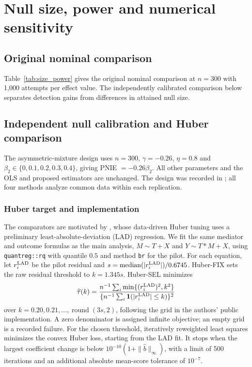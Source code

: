 \clearpage
\section{Null size, power and numerical sensitivity}
\label{sec:calibrated-power}

\subsection{Original nominal comparison}

Table~\ref{tab:size_power} gives the original nominal comparison at $n=300$ with 1,000 attempts per effect value. The independently calibrated comparison below separates detection gains from differences in attained null size.


\FloatBarrier

\subsection{Independent null calibration and Huber comparison}

The asymmetric-mixture design uses $n=300$, $\gamma=-0.26$, $\eta=0.8$ and $\beta_2\in\{0,0.1,0.2,0.3,0.4\}$, giving PNIE $=-0.26\beta_2$. All other parameters and the OLS and proposed estimators are unchanged. The design was recorded in ; all four methods analyze common data within each replication.

\subsubsection*{Huber target and implementation}

The comparators are motivated by \citet{wang2025}, whose data-driven Huber tuning uses a preliminary least-absolute-deviation (LAD) regression. We fit the same mediator and outcome formulas as the main analysis, $M\sim T+X$ and $Y\sim T*M+X$, using \texttt{quantreg::rq} with quantile $0.5$ and method \texttt{br} for the pilot. For each equation, let $r_i^{\rm LAD}$ be the pilot residual and $s=\operatorname{median}(|r_i^{\rm LAD}|)/0.6745$. Huber-FIX sets the raw residual threshold to $k=1.345s$. Huber-SEL minimizes
\[
\widehat\tau(k)=
\frac{n^{-1}\sum_i\min\{(r_i^{\rm LAD})^2,k^2\}}
     {\{n^{-1}\sum_i\mathbf1(|r_i^{\rm LAD}|\le k)\}^2}
\]
over $k=0.20,0.21,\ldots,\operatorname{round}(3s,2)$, following the grid in the authors' public implementation. A zero denominator is assigned infinite objective; an empty grid is a recorded failure. For the chosen threshold, iteratively reweighted least squares minimizes the convex Huber loss, starting from the LAD fit. It stops when the largest coefficient change is below $10^{-10}(1+\|\widehat b\|_\infty)$, with a limit of 500 iterations and an additional absolute mean-score tolerance of $10^{-7}$.

